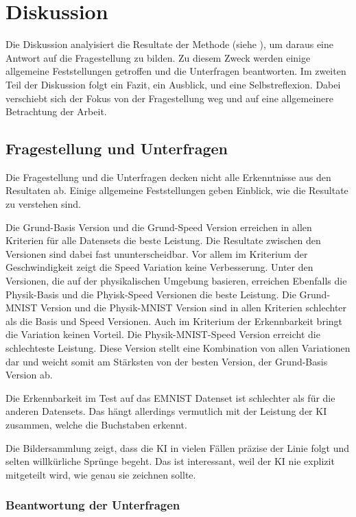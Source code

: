 \chapter{Diskussion}
\label{chap:d}
Die Diskussion analyisiert die Resultate der Methode (siehe ),
um daraus eine Antwort auf die Fragestellung zu bilden. Zu diesem Zweck werden
einige allgemeine Feststellungen getroffen und die Unterfragen beantworten. Im
zweiten Teil der Diskussion folgt ein Fazit, ein Ausblick, und eine
Selbstreflexion. Dabei verschiebt sich der Fokus von der Fragestellung weg und
auf eine allgemeinere Betrachtung der Arbeit.


\section{Fragestellung und Unterfragen}
\label{chap:d_frage}
Die Fragestellung und die Unterfragen decken nicht alle Erkenntnisse aus den
Resultaten ab. Einige allgemeine Feststellungen geben Einblick, wie die
Resultate zu verstehen sind. 

Die Grund-Basis Version und die Grund-Speed Version erreichen in allen Kriterien
für alle Datensets die beste Leistung. Die Resultate zwischen den Versionen sind
dabei fast ununterscheidbar. Vor allem im Kriterium der Geschwindigkeit zeigt
die Speed Variation keine Verbesserung. Unter den Versionen, die auf der
physikalischen Umgebung basieren, erreichen Ebenfalls die Physik-Basis und die
Phyisk-Speed Versionen die beste Leistung. Die Grund-MNIST Version und die
Physik-MNIST Version sind in allen Kriterien schlechter als die Basis und Speed
Versionen. Auch im Kriterium der Erkennbarkeit bringt die Variation keinen
Vorteil. Die Physik-MNIST-Speed Version erreicht die schlechteste Leistung.
Diese Version stellt eine Kombination von allen Variationen dar und weicht somit
am Stärksten von der besten Version, der Grund-Basis Version ab.

Die Erkennbarkeit im Test auf das EMNIST Datenset ist schlechter als für die
anderen Datensets. Das hängt allerdings vermutlich mit der Leistung der KI
zusammen, welche die Buchstaben erkennt.

Die Bildersammlung zeigt, dass die KI in vielen Fällen präzise der Linie folgt
und selten willkürliche Sprünge begeht. Das ist interessant, weil der KI nie
explizit mitgeteilt wird, wie genau sie zeichnen sollte.


\subsection{Beantwortung der Unterfragen}
\label{sub:d_frage_unter}

